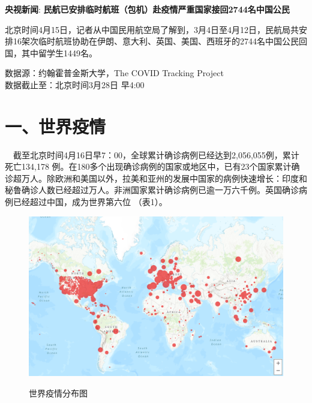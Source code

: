 \documentclass[]{article}
\begin{document}
\textbf{\textcolor{glaucous}{央视新闻}}:
\textbf{民航已安排临时航班（包机）赴疫情严重国家接回2744名中国公民}

北京时间4月15日，记者从中国民用航空局了解到，3月4日至4月12日，民航局共安排16架次临时航班协助在伊朗、意大利、英国、美国、西班牙的2744名中国公民回国，其中留学生1449名。

%
  \noindent{}%

\begin{Large}
{数据源：约翰霍普金斯大学，The COVID Tracking Project \\ 数据截止至：北京时间3月28日 早4:00}
\end{Large}

\hypertarget{section-2}{%
\section{\texorpdfstring{\textcolor{glaucous}{\Huge 一、世界疫情}}{}}\label{section-2}}

\(\quad\)截至北京时间4月16日早7：00，全球累计确诊病例已经达到2,056,055例，累计死亡134,178
例。在180多个出现确诊病例的国家或地区中，已有23个国家累计确诊超万人。除欧洲和美国以外，拉美和亚州的发展中国家的病例快速增长：印度和秘鲁确诊人数已经超过万人。非洲国家累计确诊病例已逾一万六千例。英国确诊病例已经超过中国，成为世界第六位
（表1）。

\begin{figure}[H]
\caption{世界疫情分布图} %
\centering
\includegraphics[]{./input/covid1.png} %
\label{} %
\end{figure}
\end{document}
